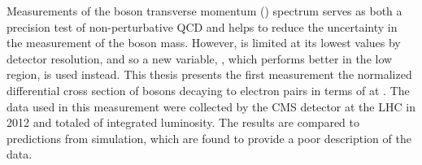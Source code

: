 
Measurements of the \Z boson transverse momentum (\bosonpt) spectrum serves as
both a precision test of non-perturbative QCD and helps to reduce the
uncertainty in the measurement of the \W boson mass. However, \bosonpt is
limited at its lowest values by detector resolution, and so a new variable,
\phistar, which performs better in the low \bosonpt region, is used instead.
This thesis presents the first measurement the normalized differential cross
section of \Z bosons decaying to electron pairs in terms of \phistar at
\rootseight. The data used in this measurement were collected by the CMS
detector at the LHC in 2012 and totaled \GoodLumiNumber of integrated
luminosity. The results are compared to predictions from simulation, which are
found to provide a poor description of the data.

